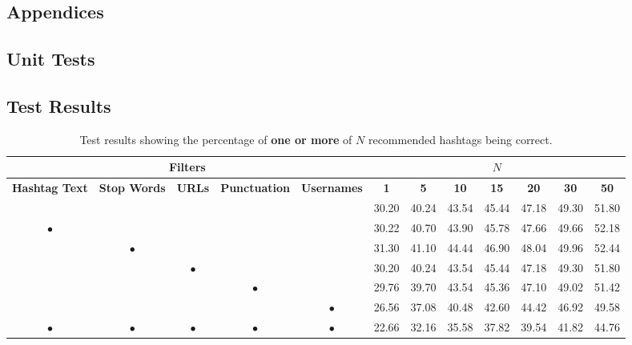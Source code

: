 \documentclass[11pt,a4paper]{report}
\renewcommand{\arraystretch}{1.5}
\begin{document}
\begin{subappendices}
\renewcommand\thesection{\Alph{section}}
\chapter*{Appendices}

\section{Unit Tests}
\label{appendix:unittests}
\pagebreak

\renewcommand{\arraystretch}{1.3}
\begin{landscape}
\section{Test Results}
\label{appendix:testresults}
\begin{table}[H]
    \centering
    \small
    \begin{tabular}{|c|c|c|c|c||c|c|c|c|c|c|c|}
        \hline
        \multicolumn{5}{|c||}{Filters} & \multicolumn{7}{|c|}{$N$} \\
        \hline
        \textbf{Hashtag Text} & \textbf{Stop Words} & \textbf{URLs} & \textbf{Punctuation} & \textbf{Usernames} & \textbf{1} & \textbf{5} & \textbf{10} & \textbf{15} & \textbf{20} & \textbf{30} & \textbf{50} \\
        \hline
        \hline
        & & & & & 30.20 & 40.24 & 43.54 & 45.44 & 47.18 & 49.30 & 51.80 \\
        \hline
        $\bullet$ & & & & & 30.22 & 40.70 & 43.90 & 45.78 & 47.66 & 49.66 & 52.18 \\
        \hline
        & $\bullet$ & & & & 31.30 & 41.10 & 44.44 & 46.90 & 48.04 & 49.96 & 52.44 \\
        \hline
        & & $\bullet$ & & & 30.20 & 40.24 & 43.54 & 45.44 & 47.18 & 49.30 & 51.80 \\
        \hline
        & & & $\bullet$ & & 29.76 & 39.70 & 43.54 & 45.36 & 47.10 & 49.02 & 51.42 \\
        \hline
        & & & & $\bullet$ & 26.56 & 37.08 & 40.48 & 42.60 & 44.42 & 46.92 & 49.58 \\
        \hline
        $\bullet$ & $\bullet$ & $\bullet$ & $\bullet$ & $\bullet$ & 22.66 & 32.16 & 35.58 & 37.82 & 39.54 & 41.82 & 44.76 \\
        \hline
    \end{tabular}
    \caption*{Test results showing the percentage of \textbf{one or more} of $N$ recommended hashtags being correct.}
\end{table}


\end{landscape}
\end{subappendices}
\end{document}
